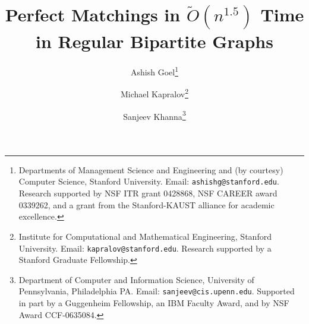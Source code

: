 \documentclass[11pt]{article}
\begin{document}
\title{\Large Perfect Matchings in $\tilde{O}(n^{1.5})$ Time in Regular Bipartite Graphs}
\author{Ashish Goel\thanks{
    Departments of Management Science and Engineering and (by courtesy)
    Computer Science, Stanford University.
    Email: {\tt ashishg@stanford.edu}.
    Research supported by NSF
    ITR grant 0428868, NSF CAREER award 0339262, and a grant from the
    Stanford-KAUST alliance for academic excellence.}\\
\and Michael Kapralov\thanks{
    Institute for Computational and Mathematical Engineering, Stanford University.
    Email: {\tt kapralov@stanford.edu}. Research supported by a Stanford Graduate Fellowship.}\\   
\and Sanjeev Khanna\thanks{Department of Computer and Information Science, University of Pennsylvania,
Philadelphia PA. Email: {\tt sanjeev@cis.upenn.edu}. Supported in
part by a Guggenheim Fellowship, an IBM Faculty Award, and by NSF Award CCF-0635084.}
}
\end{document}
